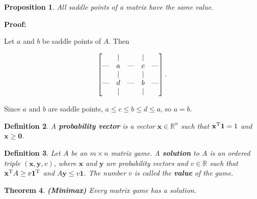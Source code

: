 \documentclass{article}
\theoremstyle{colontheorem}
\newtheorem{theorem}{Theorem}[section]
\newtheorem{proposition}[theorem]{Proposition}
\newtheorem{definition}[theorem]{Definition}
\newcommand{\T}{^\textnormal{T}}
\newenvironment{Theorem}
{
	\begin{mdframed}[backgroundcolor=TheoremOrange!10]
	\begin{theorem}
}
{
	\end{theorem}
	\end{mdframed}
	
	\vspace{.15in}
}
\newenvironment{Proposition}
{
	\begin{mdframed}[backgroundcolor=TheoremOrange!10]
	\begin{proposition}
}
{
	\end{proposition}
	\end{mdframed}
	
	\vspace{.15in}
}
\newenvironment{Def}
{
	\begin{mdframed}[backgroundcolor=DefGreen!10]
	\begin{definition}
}
{
	\end{definition}
	\end{mdframed}
	
	\vspace{.15in}
}
\newenvironment{Proof}
{
	\vspace{-.3in}
	
	\begin{mdframed}[backgroundcolor=ProofPurple!10]
	\textbf{Proof:}%
}
{
	\end{mdframed}
	
	\vspace{.15in}
}
\begin{document}
\begin{Proposition}
	
	All saddle points of a matrix have the same value.
	
\end{Proposition}



\begin{Proof}
	Let $a$ and $b$ be saddle points of $A$. Then
	
	$$
		\begin{bmatrix}
			& | & & | &\\
			\textnormal{---} & a & \textnormal{---} & c & \textnormal{---}\\
			& | & & | &\\
			\textnormal{---} & d & \textnormal{---} & b & \textnormal{---}\\
			& | & & | &\\
		\end{bmatrix}.
	$$
	
	Since $a$ and $b$ are saddle points, $a \leq c \leq b \leq d \leq a$, so $a = b$.
	
\end{Proof}



\begin{Def}
	
	A \textbf{probability vector} is a vector $\mathbf{x} \in \mathbb{R}^n$ such that $\mathbf{x}\T \mathbf{1} = 1$ and $\mathbf{x} \geq \mathbf{0}$.
	
\end{Def}



\begin{Def}
	
	Let $A$ be an $m \times n$ matrix game. A \textbf{solution} to $A$ is an ordered triple $(\mathbf{x}, \mathbf{y}, v)$, where $\mathbf{x}$ and $\mathbf{y}$ are probability vectors and $v \in \mathbb{R}$ such that $\mathbf{x}\T A \geq v \mathbf{1}\T$ and $A \mathbf{y} \leq v \mathbf{1}$. The number $v$ is called the \textbf{value} of the game.
	
\end{Def}



\begin{Theorem}
	
	\textbf{(Minimax)} Every matrix game has a solution.
	
\end{Theorem}
\end{document}
